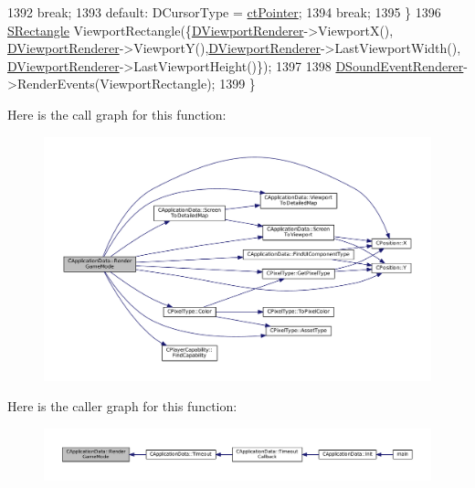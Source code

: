 \begin{DoxyCode}
1392                                     \textcolor{keywordflow}{break};
1393         \textcolor{keywordflow}{default}:                    DCursorType = \hyperlink{classCApplicationData_ad024b66b60017c45c47a85dbc636ae69aae3df9571a0bd8f05d668cca8871dbc0}{ctPointer};
1394                                     \textcolor{keywordflow}{break};
1395     \}
1396     \hyperlink{structSRectangle}{SRectangle} ViewportRectangle(\{\hyperlink{classCApplicationData_a31da050ebca942272344c8b736d72848}{DViewportRenderer}->ViewportX(),
      \hyperlink{classCApplicationData_a31da050ebca942272344c8b736d72848}{DViewportRenderer}->ViewportY(),\hyperlink{classCApplicationData_a31da050ebca942272344c8b736d72848}{DViewportRenderer}->LastViewportWidth(),
      \hyperlink{classCApplicationData_a31da050ebca942272344c8b736d72848}{DViewportRenderer}->LastViewportHeight()\});
1397     
1398     \hyperlink{classCApplicationData_af2959556fc881145d9d777c627a9345d}{DSoundEventRenderer}->RenderEvents(ViewportRectangle);
1399 \}
\end{DoxyCode}
Here is the call graph for this function\+:
\nopagebreak
\begin{figure}[H]
\begin{center}
\leavevmode
\includegraphics[width=350pt]{classCApplicationData_ae5ba05c6fb7e6f0414c26f0b44bc842c_cgraph}
\end{center}
\end{figure}
Here is the caller graph for this function\+:
\nopagebreak
\begin{figure}[H]
\begin{center}
\leavevmode
\includegraphics[width=350pt]{classCApplicationData_ae5ba05c6fb7e6f0414c26f0b44bc842c_icgraph}
\end{center}
\end{figure}
\hypertarget{classCApplicationData_a72fff3a266be49b3e9f323dcfe545923}{}\label{classCApplicationData_a72fff3a266be49b3e9f323dcfe545923} 
